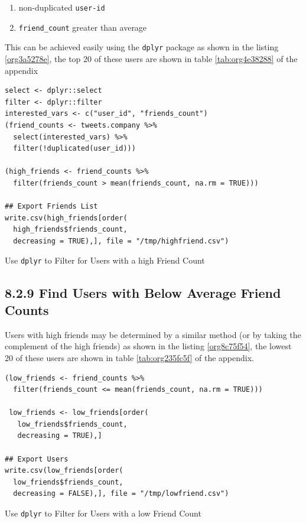 \documentclass[11pt]{article}
\begin{document}
\begin{enumerate}
\item non-duplicated \texttt{user-id}
\item \texttt{friend\_count} greater than average
\end{enumerate}

This can be achieved easily using the \texttt{dplyr} package as shown in the listing \ref{org3a5278e}, the top 20 of these users are shown in table \ref{tab:org4e38288} of the appendix

\begin{listing}[htbp]
\begin{verbatim}
select <- dplyr::select
filter <- dplyr::filter
interested_vars <- c("user_id", "friends_count")
(friend_counts <- tweets.company %>%
  select(interested_vars) %>%
  filter(!duplicated(user_id)))

(high_friends <- friend_counts %>%
  filter(friends_count > mean(friends_count, na.rm = TRUE)))

## Export Friends List
write.csv(high_friends[order(
  high_friends$friends_count,
  decreasing = TRUE),], file = "/tmp/highfriend.csv")
\end{verbatim}
\caption{\label{org3a5278e}Use \texttt{dplyr} to Filter for Users with a high Friend Count}
\end{listing}

\subsection{8.2.9 Find Users with Below Average Friend Counts}
\label{sec:org2477593}
Users with high friends may be determined by a similar method (or by taking the complement of the high friends) as shown in the listing \ref{org8c75f54}, the lowest 20 of these users are shown in table \ref{tab:org235fc5f} of the appendix.

\begin{listing}[htbp]
\begin{verbatim}
(low_friends <- friend_counts %>%
  filter(friends_count <= mean(friends_count, na.rm = TRUE)))

 low_friends <- low_friends[order(
   low_friends$friends_count,
   decreasing = TRUE),]

## Export Users
write.csv(low_friends[order(
  low_friends$friends_count,
  decreasing = FALSE),], file = "/tmp/lowfriend.csv")
\end{verbatim}
\caption{\label{org8c75f54}Use \texttt{dplyr} to Filter for Users with a low Friend Count}
\end{listing}
\end{document}
